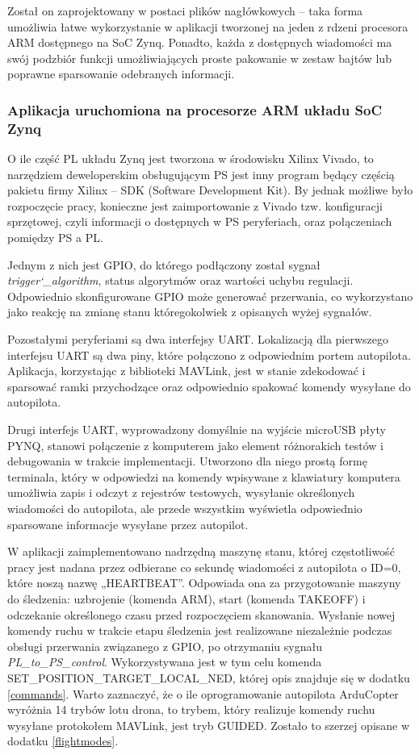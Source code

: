 Został on zaprojektowany w postaci plików nagłówkowych -- taka forma umożliwia łatwe wykorzystanie w aplikacji tworzonej na jeden z rdzeni procesora ARM dostępnego na SoC Zynq. 
Ponadto, każda z dostępnych wiadomości ma swój podzbiór funkcji umożliwiających proste pakowanie w zestaw bajtów lub poprawne sparsowanie odebranych informacji.


\subsubsection{Aplikacja uruchomiona na procesorze ARM układu SoC Zynq}

O ile część PL układu Zynq jest tworzona w środowisku Xilinx Vivado, to narzędziem deweloperskim obsługującym PS jest inny program będący częścią pakietu firmy Xilinx -- SDK (Software Development Kit). 
By jednak możliwe było rozpoczęcie pracy, konieczne jest zaimportowanie z Vivado tzw. konfiguracji sprzętowej, czyli informacji o dostępnych w PS peryferiach, oraz połączeniach pomiędzy PS a PL.

Jednym z nich jest GPIO, do którego podłączony został sygnał \textit{trigger\char`_algorithm}, status algorytmów oraz wartości uchybu regulacji. 
Odpowiednio skonfigurowane GPIO może generować przerwania, co wykorzystano jako reakcję na zmianę stanu któregokolwiek z opisanych wyżej sygnałów.

Pozostałymi peryferiami są dwa interfejsy UART. 
Lokalizacją dla pierwszego interfejsu UART są dwa piny, które połączono z odpowiednim portem autopilota. 
Aplikacja, korzystając z biblioteki MAVLink, jest w stanie zdekodować i sparsować ramki przychodzące oraz odpowiednio spakować komendy wysyłane do autopilota.

Drugi interfejs UART, wyprowadzony domyślnie na wyjście microUSB płyty PYNQ, stanowi połączenie z komputerem jako element różnorakich testów i debugowania w trakcie implementacji. 
Utworzono dla niego prostą formę terminala, który w odpowiedzi na komendy wpisywane z klawiatury komputera umożliwia zapis i odczyt z rejestrów testowych, wysyłanie określonych wiadomości do autopilota, ale przede wszystkim wyświetla odpowiednio sparsowane informacje wysyłane przez autopilot.

W aplikacji zaimplementowano nadrzędną maszynę stanu, której częstotliwość pracy jest nadana przez odbierane co sekundę wiadomości z autopilota o ID=0, które noszą nazwę „HEARTBEAT”.
Odpowiada ona za przygotowanie maszyny do śledzenia: uzbrojenie (komenda ARM), start (komenda TAKEOFF) i odczekanie określonego czasu przed rozpoczęciem skanowania. Wysłanie nowej komendy ruchu w trakcie etapu śledzenia jest realizowane niezależnie  podczas obsługi przerwania związanego z GPIO, po otrzymaniu sygnału \textit{PL\_to\_PS\_control}. 
Wykorzystywana jest w tym celu komenda SET\_POSITION\_TARGET\_LOCAL\_NED, której opis znajduje się w dodatku \ref{commands}. 
Warto zaznaczyć, że o ile oprogramowanie autopilota ArduCopter wyróżnia 14 trybów lotu drona, to trybem, który realizuje komendy ruchu wysyłane protokołem MAVLink, jest tryb GUIDED. 
Zostało to szerzej opisane w dodatku \ref{flightmodes}.


